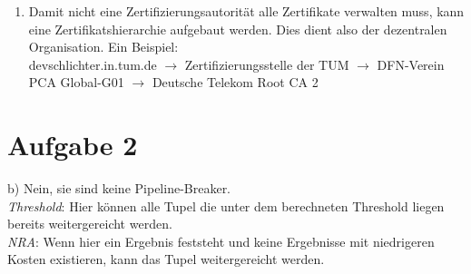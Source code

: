 \documentclass[a4paper]{scrartcl}
\begin{document}
\begin{enumerate}[label=\alph*)]
\item Damit nicht eine Zertifizierungsautorität alle Zertifikate verwalten muss, kann eine Zertifikatshierarchie aufgebaut werden. Dies dient also der dezentralen Organisation. Ein Beispiel: \\
devschlichter.in.tum.de $ \rightarrow $ Zertifizierungsstelle der TUM $ \rightarrow $ DFN-Verein PCA Global-G01 $ \rightarrow $ Deutsche Telekom Root CA 2


\end{enumerate}


\section*{Aufgabe 2}
b) Nein, sie sind keine Pipeline-Breaker.\\
\textit{Threshold}: Hier können alle Tupel die unter dem berechneten Threshold liegen bereits weitergereicht werden.\\
\textit{NRA}: Wenn hier ein Ergebnis feststeht und keine Ergebnisse mit niedrigeren Kosten existieren, kann das Tupel weitergereicht werden. 
\end{document}
